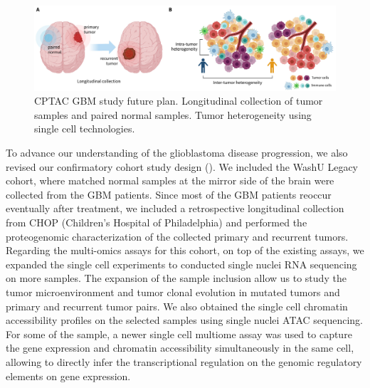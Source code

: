 \begin{figure}[tb]
    \centering
    \includegraphics[width=1\linewidth]{figures/chap05_conclusion/gbm_future_plan.pdf}
    \caption[CPTAC GBM study future plan.]{%
        CPTAC GBM study future plan.
         Longitudinal collection of tumor samples and paired normal samples.
         Tumor heterogeneity using single cell technologies.
    }
    \label{fig:cptac-gbm-future-plan}
\end{figure}

To advance our understanding of the glioblastoma disease progression, we also revised our confirmatory cohort study design (). We included the WashU Legacy cohort, where matched normal samples at the mirror side of the brain were collected from the GBM patients. Since most of the GBM patients reoccur eventually after treatment, we included a retrospective longitudinal collection from CHOP (Children's Hospital of Philadelphia) and performed the proteogenomic characterization of the collected primary and recurrent tumors. Regarding the multi-omics assays for this cohort, on top of the existing assays, we expanded the single cell experiments to conducted single nuclei RNA sequencing on more samples. The expansion of the sample inclusion allow us to study the tumor microenvironment and tumor clonal evolution in  mutated tumors and primary and recurrent tumor pairs. We also obtained the single cell chromatin accessibility profiles on the selected samples using single nuclei ATAC sequencing. For some of the sample, a newer single cell multiome assay was used to capture the gene expression and chromatin accessibility simultaneously in the same cell, allowing to directly infer the transcriptional regulation on the genomic regulatory elements on gene expression.

